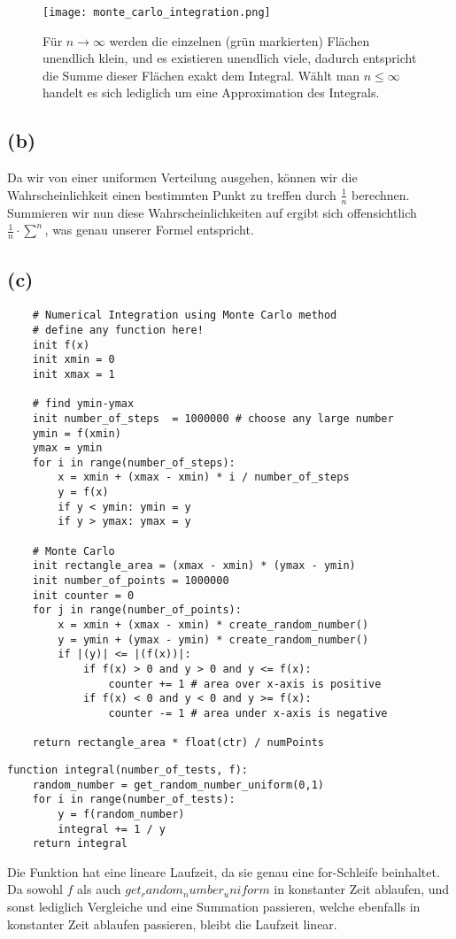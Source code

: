 \documentclass[a4paper]{scrartcl}
\begin{document}
\begin{figure}[h]
	\texttt{[image: monte\_carlo\_integration.png]}
	\caption{Für $n \rightarrow \infty$ werden die einzelnen (grün markierten) Flächen unendlich klein, und es existieren unendlich viele, dadurch entspricht die Summe dieser Flächen exakt dem Integral. Wählt man $n \leq \infty$ handelt es sich lediglich um eine Approximation des Integrals.}
\end{figure}


\subsection*{(b)}
Da wir von einer uniformen Verteilung ausgehen, können wir die Wahrscheinlichkeit einen bestimmten Punkt zu treffen durch $\frac{1}{n}$ berechnen.\\ 
Summieren wir nun diese Wahrscheinlichkeiten auf ergibt sich offensichtlich $\frac{1}{n} \cdot \sum_{}^{n}$, was genau unserer Formel entspricht.



\subsection*{(c)}
\begin{lstlisting}
	# Numerical Integration using Monte Carlo method
	# define any function here!
	init f(x)
	init xmin = 0
	init xmax = 1
	
	# find ymin-ymax
	init number_of_steps  = 1000000 # choose any large number
	ymin = f(xmin)
	ymax = ymin
	for i in range(number_of_steps):
		x = xmin + (xmax - xmin) * i / number_of_steps
		y = f(x)
		if y < ymin: ymin = y
		if y > ymax: ymax = y
		
	# Monte Carlo
	init rectangle_area = (xmax - xmin) * (ymax - ymin)
	init number_of_points = 1000000
	init counter = 0
	for j in range(number_of_points):
		x = xmin + (xmax - xmin) * create_random_number()
		y = ymin + (ymax - ymin) * create_random_number()
		if |(y)| <= |(f(x))|:
			if f(x) > 0 and y > 0 and y <= f(x):
				counter += 1 # area over x-axis is positive
			if f(x) < 0 and y < 0 and y >= f(x):
				counter -= 1 # area under x-axis is negative
	
	return rectangle_area * float(ctr) / numPoints
\end{lstlisting}


\begin{lstlisting}
function integral(number_of_tests, f):
	random_number = get_random_number_uniform(0,1)
	for i in range(number_of_tests):
		y = f(random_number)
		integral += 1 / y
	return integral
\end{lstlisting}
Die Funktion hat eine lineare Laufzeit, da sie genau eine for-Schleife beinhaltet. Da sowohl $f$ als auch $get_random_number_uniform$ in konstanter Zeit ablaufen, und sonst lediglich Vergleiche und eine Summation passieren, welche ebenfalls in konstanter Zeit ablaufen passieren, bleibt die Laufzeit linear.
\end{document}
